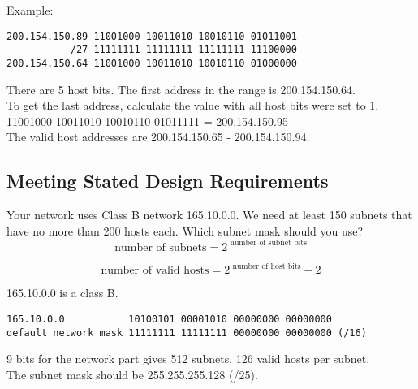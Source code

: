 Example:

\begin{verbatim}
200.154.150.89 11001000 10011010 10010110 01011001
           /27 11111111 11111111 11111111 11100000
200.154.150.64 11001000 10011010 10010110 01000000
\end{verbatim}

There are 5 host bits. The first address in the range is 200.154.150.64.\\

To get the last address, calculate the value with all host bits were set to 1.\\

11001000 10011010 10010110 01011111 = 200.154.150.95\\

The valid host addresses are 200.154.150.65 - 200.154.150.94.

\subsection{Meeting Stated Design Requirements}

Your network uses Class B network 165.10.0.0. We need at least 150 subnets
that have no more than 200 hosts each. Which subnet mask should you use?\\

\begin{equation}
\mbox{number of subnets} = 2 ^{\mbox{ number of subnet bits}}
\end{equation}

\begin{equation}
\mbox{number of valid hosts} = 2 ^{\mbox{ number of host bits}} - 2
\end{equation}

165.10.0.0 is a class B.

\begin{verbatim}
165.10.0.0           10100101 00001010 00000000 00000000
default network mask 11111111 11111111 00000000 00000000 (/16)
\end{verbatim}

9 bits for the network part gives 512 subnets, 126 valid hosts per subnet.\\

The subnet mask should be 255.255.255.128 (/25).
